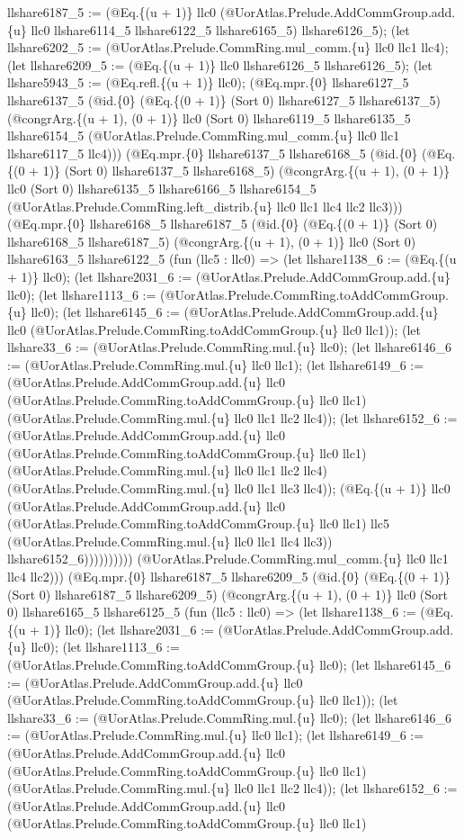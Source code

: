 \documentclass[11pt]{article}
\begin{document}
llshare6187\_5 := (@Eq.\{(u + 1)\} llc0 (@UorAtlas.Prelude.AddCommGroup.add.\{u\} llc0 llshare6114\_5 llshare6122\_5 llshare6165\_5) llshare6126\_5); (let llshare6202\_5 := (@UorAtlas.Prelude.CommRing.mul\_comm.\{u\} llc0 llc1 llc4); (let llshare6209\_5 := (@Eq.\{(u + 1)\} llc0 llshare6126\_5 llshare6126\_5); (let llshare5943\_5 := (@Eq.refl.\{(u + 1)\} llc0); (@Eq.mpr.\{0\} llshare6127\_5 llshare6137\_5 (@id.\{0\} (@Eq.\{(0 + 1)\} (Sort 0) llshare6127\_5 llshare6137\_5) (@congrArg.\{(u + 1), (0 + 1)\} llc0 (Sort 0) llshare6119\_5 llshare6135\_5 llshare6154\_5 (@UorAtlas.Prelude.CommRing.mul\_comm.\{u\} llc0 llc1 llshare6117\_5 llc4))) (@Eq.mpr.\{0\} llshare6137\_5 llshare6168\_5 (@id.\{0\} (@Eq.\{(0 + 1)\} (Sort 0) llshare6137\_5 llshare6168\_5) (@congrArg.\{(u + 1), (0 + 1)\} llc0 (Sort 0) llshare6135\_5 llshare6166\_5 llshare6154\_5 (@UorAtlas.Prelude.CommRing.left\_distrib.\{u\} llc0 llc1 llc4 llc2 llc3))) (@Eq.mpr.\{0\} llshare6168\_5 llshare6187\_5 (@id.\{0\} (@Eq.\{(0 + 1)\} (Sort 0) llshare6168\_5 llshare6187\_5) (@congrArg.\{(u + 1), (0 + 1)\} llc0 (Sort 0) llshare6163\_5 llshare6122\_5 (fun (llc5 : llc0) => (let llshare1138\_6 := (@Eq.\{(u + 1)\} llc0); (let llshare2031\_6 := (@UorAtlas.Prelude.AddCommGroup.add.\{u\} llc0); (let llshare1113\_6 := (@UorAtlas.Prelude.CommRing.toAddCommGroup.\{u\} llc0); (let llshare6145\_6 := (@UorAtlas.Prelude.AddCommGroup.add.\{u\} llc0 (@UorAtlas.Prelude.CommRing.toAddCommGroup.\{u\} llc0 llc1)); (let llshare33\_6 := (@UorAtlas.Prelude.CommRing.mul.\{u\} llc0); (let llshare6146\_6 := (@UorAtlas.Prelude.CommRing.mul.\{u\} llc0 llc1); (let llshare6149\_6 := (@UorAtlas.Prelude.AddCommGroup.add.\{u\} llc0 (@UorAtlas.Prelude.CommRing.toAddCommGroup.\{u\} llc0 llc1) (@UorAtlas.Prelude.CommRing.mul.\{u\} llc0 llc1 llc2 llc4)); (let llshare6152\_6 := (@UorAtlas.Prelude.AddCommGroup.add.\{u\} llc0 (@UorAtlas.Prelude.CommRing.toAddCommGroup.\{u\} llc0 llc1) (@UorAtlas.Prelude.CommRing.mul.\{u\} llc0 llc1 llc2 llc4) (@UorAtlas.Prelude.CommRing.mul.\{u\} llc0 llc1 llc3 llc4)); (@Eq.\{(u + 1)\} llc0 (@UorAtlas.Prelude.AddCommGroup.add.\{u\} llc0 (@UorAtlas.Prelude.CommRing.toAddCommGroup.\{u\} llc0 llc1) llc5 (@UorAtlas.Prelude.CommRing.mul.\{u\} llc0 llc1 llc4 llc3)) llshare6152\_6)))))))))) (@UorAtlas.Prelude.CommRing.mul\_comm.\{u\} llc0 llc1 llc4 llc2))) (@Eq.mpr.\{0\} llshare6187\_5 llshare6209\_5 (@id.\{0\} (@Eq.\{(0 + 1)\} (Sort 0) llshare6187\_5 llshare6209\_5) (@congrArg.\{(u + 1), (0 + 1)\} llc0 (Sort 0) llshare6165\_5 llshare6125\_5 (fun (llc5 : llc0) => (let llshare1138\_6 := (@Eq.\{(u + 1)\} llc0); (let llshare2031\_6 := (@UorAtlas.Prelude.AddCommGroup.add.\{u\} llc0); (let llshare1113\_6 := (@UorAtlas.Prelude.CommRing.toAddCommGroup.\{u\} llc0); (let llshare6145\_6 := (@UorAtlas.Prelude.AddCommGroup.add.\{u\} llc0 (@UorAtlas.Prelude.CommRing.toAddCommGroup.\{u\} llc0 llc1)); (let llshare33\_6 := (@UorAtlas.Prelude.CommRing.mul.\{u\} llc0); (let llshare6146\_6 := (@UorAtlas.Prelude.CommRing.mul.\{u\} llc0 llc1); (let llshare6149\_6 := (@UorAtlas.Prelude.AddCommGroup.add.\{u\} llc0 (@UorAtlas.Prelude.CommRing.toAddCommGroup.\{u\} llc0 llc1) (@UorAtlas.Prelude.CommRing.mul.\{u\} llc0 llc1 llc2 llc4)); (let llshare6152\_6 := (@UorAtlas.Prelude.AddCommGroup.add.\{u\} llc0 (@UorAtlas.Prelude.CommRing.toAddCommGroup.\{u\} llc0 llc1) 
\end{document}
